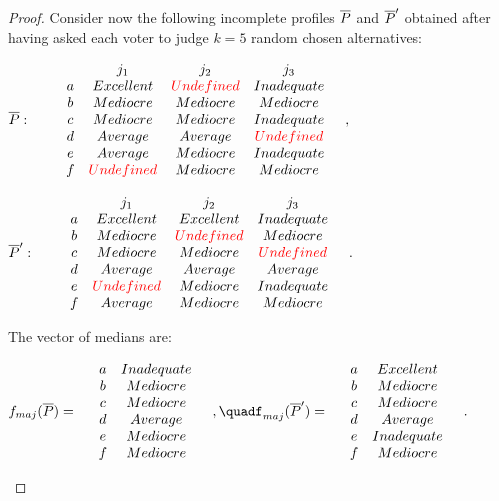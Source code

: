 \documentclass[version=3.21, pagesize, twoside=off, bibliography=totoc, DIV=calc, fontsize=12pt, a4paper]{scrartcl}
\begin{document}
\begin{proof}
	Consider now the following incomplete profiles $\overline{P}$ and $\overline{P}'$ obtained after having asked each voter to judge $k=5$ random chosen alternatives: 
	\begin{center}
		$\overline{P}: \qquad
		\begin{array}{cccc}
			& j_1 & j_2 & j_3 \\
			a &	Excellent	& {\color{red}Undefined} & Inadequate\\
			b &	Mediocre	& Mediocre	& Mediocre\\
			c &	Mediocre	& Mediocre & Inadequate\\
			d &	Average	& Average	& {\color{red}Undefined} \\
			e &	Average	& Mediocre	& Inadequate \\
			f &	{\color{red}Undefined}	& Mediocre & Mediocre	  \\
		\end{array} \quad,
		$
	\end{center}
	\begin{center}
		$\overline{P}': \qquad
		\begin{array}{cccc}
			& j_1 & j_2 & j_3 \\
			a &	Excellent	& Excellent & Inadequate\\
			b &	Mediocre	& {\color{red}Undefined}	& Mediocre\\
			c &	Mediocre	& Mediocre & {\color{red}Undefined}\\
			d &	Average	& Average	& Average \\
			e &	{\color{red}Undefined}	& Mediocre	& Inadequate \\
			f &	Average	& Mediocre & Mediocre	  \\
		\end{array} \quad.
		$
	\end{center}
	The vector of medians are:
	\begin{center}
		$f_{maj}(\Pbar)= \quad
		\begin{array}{cc}
			a &	Inadequate \\
			b &	Mediocre \\
			c &	Mediocre \\
			d &	Average	\\
			e &	Mediocre \\
			f & Mediocre \\
		\end{array} \quad,\quad%
		f_{maj}(\Pbar')= \quad
		\begin{array}{cc}
			a &	Excellent \\
			b &	Mediocre \\
			c &	Mediocre \\
			d &	Average	\\
			e &	Inadequate \\
			f & Mediocre \\
		\end{array} \quad.
		$
	\end{center}
	

\end{proof}
\end{document}
